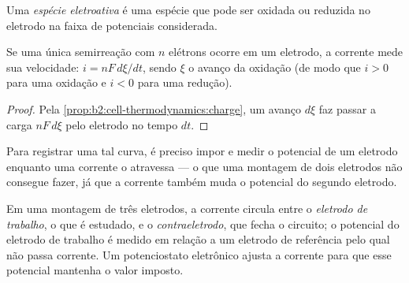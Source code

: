\begin{definition}\label{def:b2:current-potential-curves:electroactive}
Uma \emph{espécie eletroativa} é uma espécie
que pode ser oxidada ou reduzida no eletrodo na faixa de potenciais
considerada.
\end{definition}

\begin{proposition}\label{prop:b2:current-potential-curves:current-rate}
Se uma única semirreação com $n$ elétrons ocorre em um eletrodo, a
corrente mede sua velocidade: $i = nF\,d\xi/dt$, sendo $\xi$ o avanço
da oxidação (de modo que $i > 0$ para uma oxidação e $i < 0$ para uma redução).
\end{proposition}

\begin{proof}
Pela \cref{prop:b2:cell-thermodynamics:charge}, um avanço $d\xi$ faz passar a
carga $nF\,d\xi$ pelo eletrodo no tempo $dt$.
\end{proof}

Para registrar uma tal curva, é preciso impor e medir o potencial de um
eletrodo enquanto uma corrente o atravessa --- o que uma montagem de dois
eletrodos não consegue fazer, já que a corrente também muda o potencial do
segundo eletrodo.

\begin{definition}\label{def:b2:current-potential-curves:set-up}
Em uma montagem de três eletrodos, a corrente circula entre o \emph{eletrodo
de trabalho}, o que é estudado, e o \emph{contraeletrodo},
que fecha o circuito; o potencial do eletrodo de
trabalho é medido em relação a um eletrodo de referência pelo qual não
passa corrente. Um potenciostato eletrônico ajusta a corrente para que esse
potencial mantenha o valor imposto.
\end{definition}

